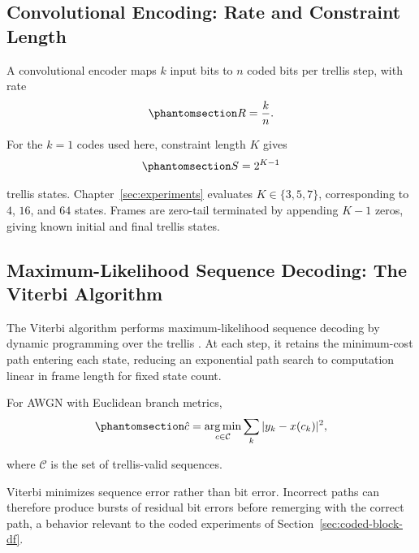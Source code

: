 \subsection{Convolutional Encoding: Rate and Constraint Length}\label{sec:convolutional-encoding-rate-constraint-length}

A convolutional encoder maps \(k\) input bits to \(n\) coded bits per trellis step, with rate \cite{ProakisSalehi2008DigitalComm}
\begin{equation}\protect\phantomsection\label{eq:conv-code-rate}
R=\frac{k}{n}.
\end{equation}

For the \(k=1\) codes used here, constraint length \(K\) gives
\begin{equation}\protect\phantomsection\label{eq:conv-trellis-states}
S=2^{K-1}
\end{equation}
trellis states. Chapter~\ref{sec:experiments} evaluates \(K\in\{3,5,7\}\), corresponding to \(4\), \(16\), and \(64\) states. Frames are zero-tail terminated by appending \(K-1\) zeros, giving known initial and final trellis states.

\subsection{Maximum-Likelihood Sequence Decoding: The Viterbi Algorithm}\label{sec:viterbi-ml-decoding}

The Viterbi algorithm performs maximum-likelihood sequence decoding by dynamic programming over the trellis \cite{Forney1972MLSE,ProakisSalehi2008DigitalComm}. At each step, it retains the minimum-cost path entering each state, reducing an exponential path search to computation linear in frame length for fixed state count.

For AWGN with Euclidean branch metrics,
\begin{equation}\protect\phantomsection\label{eq:viterbi-ml-metric}
\hat{c}
=
\operatorname*{arg\,min}_{c\in\mathcal{C}}
\sum_k
|y_k-x(c_k)|^2,
\end{equation}
where \(\mathcal{C}\) is the set of trellis-valid sequences.

Viterbi minimizes sequence error rather than bit error. Incorrect paths can therefore produce bursts of residual bit errors before remerging with the correct path, a behavior relevant to the coded experiments of Section~\ref{sec:coded-block-df}.

